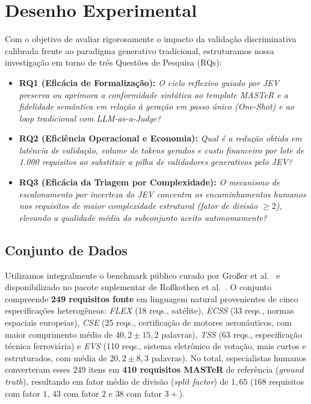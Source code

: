 \section{Desenho Experimental}

Com o objetivo de avaliar rigorosamente o impacto da validação discriminativa calibrada frente ao paradigma generativo tradicional, estruturamos nossa investigação em torno de três Questões de Pesquisa (RQs):
\begin{itemize}
    \item \textbf{RQ1 (Eficácia de Formalização):} \textit{O ciclo reflexivo guiado por JEV preserva ou aprimora a conformidade sintática ao template MASTeR e a fidelidade semântica em relação à geração em passo único (\textit{One-Shot}) e ao loop tradicional com LLM-as-a-Judge?}
    \item \textbf{RQ2 (Eficiência Operacional e Economia):} \textit{Qual é a redução obtida em latência de validação, volume de tokens gerados e custo financeiro por lote de 1.000 requisitos ao substituir a pilha de validadores generativos pelo JEV?}
    \item \textbf{RQ3 (Eficácia da Triagem por Complexidade):} \textit{O mecanismo de escalonamento por incerteza do JEV concentra os encaminhamentos humanos nos requisitos de maior complexidade estrutural (fator de divisão $\ge 2$), elevando a qualidade média do subconjunto aceito autonomamente?}
\end{itemize}

\subsection{Conjunto de Dados}
Utilizamos integralmente o benchmark público curado por Gro\ss er et al.~\cite{grosser2023comparative, grosser2024benchmarking} e disponibilizado no pacote suplementar de Ro\ss kothen et al.~\cite{rosskothen2026zenodo}. O conjunto compreende \textbf{249 requisitos fonte} em linguagem natural provenientes de cinco especificações heterogêneas: \textit{FLEX} (18 reqs., satélite), \textit{ECSS} (33 reqs., normas espaciais europeias), \textit{CSE} (25 reqs., certificação de motores aeronáuticos, com maior comprimento médio de $40{,}2 \pm 15{,}2$ palavras), \textit{TSS} (63 reqs., especificação técnica ferroviária) e \textit{EVS} (110 reqs., sistema eletrônico de votação, mais curtos e estruturados, com média de $20{,}2 \pm 8{,}3$ palavras). No total, especialistas humanos converteram esses 249 itens em \textbf{410 requisitos MASTeR} de referência (\textit{ground truth}), resultando em fator médio de divisão (\textit{split factor}) de $1{,}65$ ($168$ requisitos com fator $1$, $43$ com fator $2$ e $38$ com fator $3+$).

